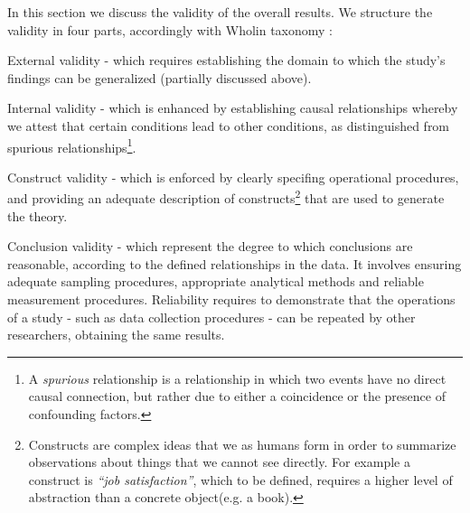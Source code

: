 \documentclass[10pt,journal,letterpaper,compsoc]{IEEEtran}
\begin{document}
In this section we discuss the validity of the overall results.  We structure the validity in four parts, accordingly with Wholin taxonomy \cite{Wohlin2000}:

\begin{compactitem}

\item External validity - which requires establishing the domain to which the study's findings can be generalized (partially discussed above).

\item Internal validity - which is enhanced by establishing causal relationships whereby we attest that certain conditions lead to other conditions, as distinguished from spurious relationships\footnote{A \textit{spurious} relationship is a relationship in which two events have no direct causal connection, but rather due to either a coincidence or the presence of confounding factors.}.
\item Construct validity - which is enforced by clearly specifing operational procedures, and providing an adequate description of constructs\footnote{Constructs are complex ideas that we as humans form in order to summarize observations about things that we cannot see directly. For example a construct is \textit{``job satisfaction''}, which to be defined, requires a higher level of abstraction than a concrete object(e.g. a book).} that are used to generate the theory.
\item Conclusion validity - which represent the degree to which conclusions are reasonable, according to the defined relationships in the data. It involves ensuring adequate sampling procedures, appropriate analytical methods and reliable measurement procedures. Reliability requires to demonstrate that the operations of a study - such as data collection procedures - can be repeated by other researchers, obtaining the same results.
\end{compactitem}

\end{document}
